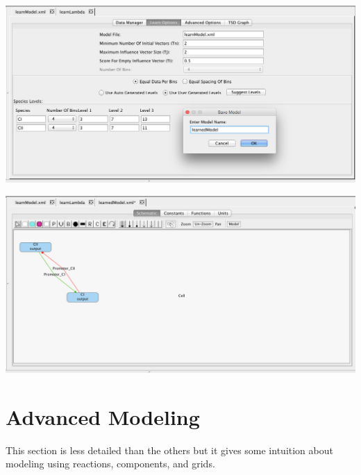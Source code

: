 \documentclass[titlepage,11pt]{article}
\begin{document}
\begin{center}
\includegraphics[width=160mm]{screenshots/learn}
\end{center}

\begin{center}
\includegraphics[width=160mm]{screenshots/learnResult}
\end{center}

\section{Advanced Modeling}

This section is less detailed than the others but it gives some intuition about modeling using reactions, components, and grids.  

\end{document}
